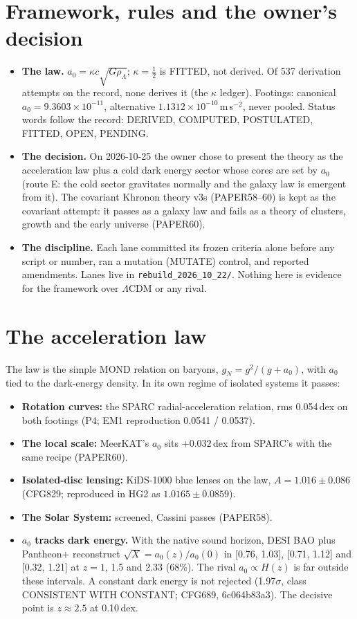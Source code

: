 \documentclass[10pt]{article}
\begin{document}
\section{Framework, rules and the owner's decision}
\begin{itemize}
\item \textbf{The law.} $a_0=\kappa c\sqrt{G\rho_\Lambda}$; $\kappa=\tfrac12$ is FITTED, not derived. Of 537 derivation attempts on the record, none derives it (the $\kappa$ ledger). Footings: canonical $a_0=9.3603\times10^{-11}$, alternative $1.1312\times10^{-10}$\,m\,s$^{-2}$, never pooled. Status words follow the record: DERIVED, COMPUTED, POSTULATED, FITTED, OPEN, PENDING.
\item \textbf{The decision.} On 2026-10-25 the owner chose to present the theory as the acceleration law plus a cold dark energy sector whose cores are set by $a_0$ (route E: the cold sector gravitates normally and the galaxy law is emergent from it). The covariant Khronon theory v3s (PAPER58--60) is kept as the covariant attempt: it passes as a galaxy law and fails as a theory of clusters, growth and the early universe (PAPER60).
\item \textbf{The discipline.} Each lane committed its frozen criteria alone before any script or number, ran a mutation (MUTATE) control, and reported amendments. Lanes live in \texttt{rebuild\_2026\_10\_22/}. Nothing here is evidence for the framework over $\Lambda$CDM or any rival.
\end{itemize}

\section{The acceleration law}
The law is the simple MOND relation on baryons, $g_N=g^2/(g+a_0)$, with $a_0$ tied to the dark-energy density. In its own regime of isolated systems it passes:
\begin{itemize}
\item \textbf{Rotation curves:} the SPARC radial-acceleration relation, rms 0.054\,dex on both footings (P4; EM1 reproduction 0.0541 / 0.0537).
\item \textbf{The local scale:} MeerKAT's $a_0$ sits $+0.032$\,dex from SPARC's with the same recipe (PAPER60).
\item \textbf{Isolated-disc lensing:} KiDS-1000 blue lenses on the law, $A=1.016\pm0.086$ (CFG829; reproduced in HG2 as $1.0165\pm0.0859$).
\item \textbf{The Solar System:} screened, Cassini passes (PAPER58).
\item \textbf{$a_0$ tracks dark energy.} With the native sound horizon, DESI BAO plus Pantheon+ reconstruct $\sqrt{X}=a_0(z)/a_0(0)$ in [0.76, 1.03], [0.71, 1.12] and [0.32, 1.21] at $z=1$, 1.5 and 2.33 (68\%). The rival $a_0\propto H(z)$ is far outside these intervals. A constant dark energy is not rejected (1.97$\sigma$, class CONSISTENT WITH CONSTANT; CFG689, 6c064b83a3). The decisive point is $z\approx2.5$ at 0.10\,dex.
\end{itemize}
\end{document}
